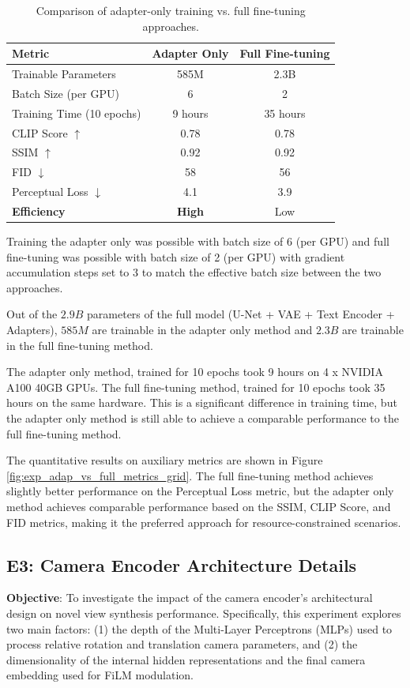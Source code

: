 \begin{table}[htbp]
  \centering
  \caption{Comparison of adapter-only training vs. full fine-tuning approaches.}
  \label{tab:adapter_vs_full_results}
  \begin{tabular}{lcc}
    \toprule
    \textbf{Metric} & \textbf{Adapter Only} & \textbf{Full Fine-tuning} \\
    \midrule
    Trainable Parameters & 585M & 2.3B \\
    Batch Size (per GPU) & 6 & 2 \\
    Training Time (10 epochs) & 9 hours & 35 hours \\
    \midrule
    CLIP Score $\uparrow$ & 0.78 & 0.78 \\
    SSIM $\uparrow$ & 0.92 & 0.92 \\
    FID $\downarrow$ & 58 & 56 \\
    Perceptual Loss $\downarrow$ & 4.1 & 3.9 \\
    \midrule
    \textbf{Efficiency} & \textbf{High} & Low \\
    \bottomrule
  \end{tabular}
\end{table}

Training the adapter only was possible with batch size of 6 (per GPU) and full fine-tuning was possible with batch size of 2 (per GPU) with gradient accumulation steps set to 3 to match the effective batch size between the two approaches.

Out of the $2.9B$ parameters of the full model (U-Net + VAE + Text Encoder + Adapters), $585M$ are trainable in the adapter only method and $2.3B$ are trainable in the full fine-tuning method.

The adapter only method, trained for 10 epochs took 9 hours on 4 x NVIDIA A100 40GB GPUs. The full fine-tuning method, trained for 10 epochs took 35 hours on the same hardware. This is a significant difference in training time, but the adapter only method is still able to achieve a comparable performance to the full fine-tuning method.

The quantitative results on auxiliary metrics are shown in Figure \ref{fig:exp_adap_vs_full_metrics_grid}. The full fine-tuning method achieves slightly better performance on the Perceptual Loss metric, but the adapter only method achieves comparable performance based on the SSIM, CLIP Score, and FID metrics, making it the preferred approach for resource-constrained scenarios.

\subsection{E3: Camera Encoder Architecture Details}\label{ssec:exp_camera_encoder_depth}
\textbf{Objective}:
To investigate the impact of the camera encoder's architectural design on novel view synthesis performance. Specifically, this experiment explores two main factors: (1) the depth of the Multi-Layer Perceptrons (MLPs) used to process relative rotation and translation camera parameters, and (2) the dimensionality of the internal hidden representations and the final camera embedding used for FiLM modulation.

